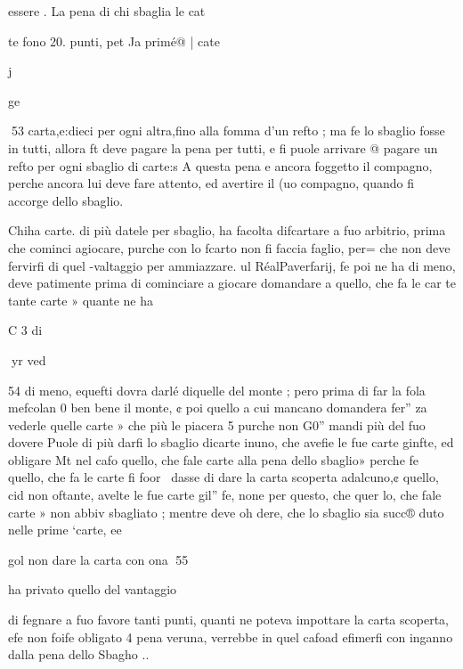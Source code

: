 \documentclass[12pt,a6paper]{article}
\begin{document}
essere .
La pena di chi sbaglia le cat

te fono 20. punti, pet Ja primé@
| cate

 

 

j

ge

 
53
carta,e:dieci per ogni altra,fino
alla fomma d’un refto ; ma fe lo
sbaglio fosse in tutti, allora ft
deve pagare la pena per tutti,
e fi puole arrivare @ pagare un
refto per ogni sbaglio di carte:s
A questa pena e ancora foggetto
il compagno, perche ancora lui
deve fare attento, ed avertire
il (uo compagno, quando fi accorge dello sbaglio.

Chiha carte. di più datele per
sbaglio, ha facolta difcartare
a fuo arbitrio, prima che cominci agiocare, purche con lo
fcarto non fi faccia faglio, per=
che non deve fervirfi di quel
-valtaggio per ammiazzare. ul
RéalPaverfarij, fe poi ne ha di
meno, deve patimente prima
di cominciare a giocare domandare a quello, che fa le car
te tante carte » quante ne ha

C 3 di

 

 

 

 
yr ved

 

 

 

 

 

54
di meno, equefti dovra darlé
diquelle del monte ; pero prima di far la fola mefcolan 0
ben bene il monte, ¢ poi quello
a cui mancano domandera fer”
za vederle quelle carte » che
più le piacera 5 purche non G0”
mandi più del fuo dovere Puole di più darfi lo sbaglio
dicarte inuno, che avefie le
fue carte ginfte, ed obligare Mt
nel cafo quello, che fale carte
alla pena dello sbaglio» perche
fe quello, che fa le carte fi foor~
dasse di dare la carta scoperta
adalcuno,¢ quello, cid non
oftante, avelte le fue carte gil”
fe, none per questo, che quer
lo, che fale carte » non abbiv
sbagliato ; mentre deve oh
dere, che lo sbaglio sia succ®
duto nelle prime ‘carte, ee

gol non dare la carta con
ona
55

ha privato quello del vantaggio

di fegnare a fuo favore tanti
punti, quanti ne poteva impottare la carta scoperta, efe non
foife obligato 4 pena veruna,
verrebbe in quel cafoad efimerfi con inganno dalla pena dello
Sbagho ..
\end{document}
